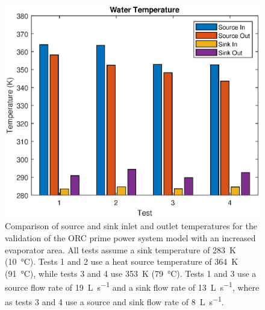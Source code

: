 \begin{figure}[p]
	\centering
	
	\includegraphics[width=\textwidth]{figures/VerificationWaterTemp02}
	
	\caption{Comparison of source and sink inlet and outlet temperatures for the validation of the ORC prime power system model with an increased evaporator area. All tests assume a sink temperature of \SI{283}{\kelvin} (\SI{10}{\degreeCelsius}). Tests 1 and 2 use a heat source temperature of \SI{364}{\kelvin} (\SI{91}{\degreeCelsius}), while tests 3 and 4 use \SI{353}{\kelvin} (\SI{79}{\degreeCelsius}). Tests 1 and 3 use a source flow rate of \SI{19}{\liter\per\second} and a sink flow rate of \SI{13}{\liter\per\second}, where as tests 3 and 4 use a source and sink flow rate of \SI{8}{\liter\per\second}.
	}
	\label{fig:verificationWaterTemp02}
\end{figure}
